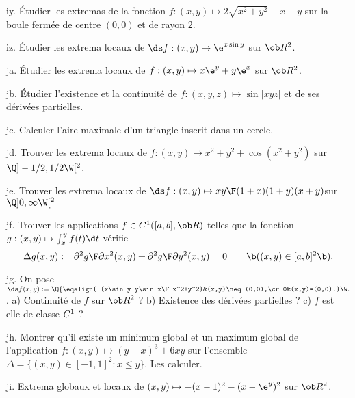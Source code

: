 \exo [Level=2,Fight=1,Learn=1,Type=\Exercices,Field=\Extrema,Origin=] iy. 
\'Etudier les extremas de la fonction $f:(x,y)\mapsto2\sqrt{x^2+y^2}-x-y$ sur la boule fermée 
de centre $(0,0)$ et de rayon $2$. 

\exo [Level=2,Fight=1,Learn=1,Type=\Exercices,Field=\Extrema,Origin=] iz. 
\'Etudier les extrema locaux de $\ds f:(x,y)\mapsto\e^{x\sin y}$ sur $\ob R^2$.  

\exo [Level=2,Fight=2,Learn=1,Type=\Exercices,Field=\Extrema,Origin=] ja. 
\'Etudier les extrema locaux de $f:(x,y)\mapsto x\e^y+y\e^x$ sur $\ob R^2$. 

\exo [Level=2,Fight=3,Learn=1,Type=\Others,Field=\Extrema,Origin=] jb. 
\'Etudier l'existence et la continuité de $f:(x,y,z)\mapsto\sin|xyz|$ 
et de ses dérivées partielles. 

\exo [Level=2,Fight=2,Learn=2,Type=\Cours,Field=\Extrema,Origin=] jc. 
Calculer l'aire maximale d'un triangle inscrit dans un cercle. 

\exo [Level=2,Fight=1,Learn=1,Type=\Exercices,Field=\Extrema,Origin=] jd. 
Trouver les extrema locaux de $f:(x,y)\mapsto x^2+y^2+\cos(x^2+y^2)$ sur $\Q]-1/2,1/2\W[^2$. 

\exo [Level=2,Fight=1,Learn=1,Type=\Exercices,Field=\Extrema,Origin=] je. 
Trouver les extrema locaux de $\ds f:(x,y)\mapsto{xy\F(1+x)(1+y)(x+y)}$sur $\Q]0,\infty\W[^2$ 

\exo [Level=2,Fight=2,Learn=1,Field=\EquationsAuxDérivéesPartielles,Type=\Exercices,Origin=] jf. 
Trouver les applications $f\in\sc C^1([a,b],\ob R)$ telles 
que la fonction $g:(x,y)\mapsto \int_x^yf(t)\d t$ 
vérifie 
$$
\Delta g(x,y):={\partial^2 g\F\partial x^2}(x,y)+{\partial^2 g\F\partial y^2}(x,y)=0\qquad\b((x,y)\in[a,b]^2\b). 
$$

\exo [Level=2,Fight=2,Learn=2,Field=\FonctionsDePlusieursVariables,Type=\Exercices,Origin=] jg. 
On pose $\ds f(x,y):=\Q\{\eqalign{
{x\sin y-y\sin x\F x^2+y^2}&(x,y)\neq(0,0),\cr
0&(x,y)=(0,0).}
\W.$. \medskip\noindent
a) Continuité de $f$ sur $\ob R^2$ ? \pn 
b) Existence des dérivées partielles ? \pn 
c) $f$ est elle de classe $\sc C^1$ ?

\exo [Level=2,Fight=2,Learn=2,Type=\Exercices,Field=\Extrema,Origin=] jh. 
Montrer qu'il existe un minimum global et un maximum global de l'application $f:(x,y)\mapsto(y-x)^3+6xy$ sur l'ensemble $\Delta=\{(x,y)\in[-1,1]^2:x\le y\}$. 
Les calculer. 

\exo [Level=2,Fight=1,Learn=1,Type=\Exercices,Field=\Extrema,Origin=] ji. 
Extrema globaux et locaux de $(x,y)\mapsto -(x-1)^2-(x-\e^y)^2$ sur $\ob R^2$. 

